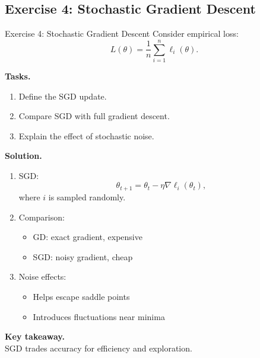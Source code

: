 \documentclass[aspectratio=169,11pt]{beamer}
\begin{document}
\subsection{Exercise 4: Stochastic Gradient Descent}
\begin{frame}[t,allowframebreaks]{Exercise 4: Stochastic Gradient Descent}
\small
Consider empirical loss:
\[
L(\theta) = \frac{1}{n} \sum_{i=1}^n \ell_i(\theta).
\]

\textbf{Tasks.}\\ \begin{enumerate}
    \item Define the SGD update.
    \item Compare SGD with full gradient descent.
    \item Explain the effect of stochastic noise.
\end{enumerate}

\textbf{Solution.}\\ \begin{enumerate}
\item SGD:
\[
\theta_{t+1} = \theta_t - \eta \nabla \ell_i(\theta_t),
\]
where $i$ is sampled randomly.

\item Comparison:
\begin{itemize}
    \item GD: exact gradient, expensive
    \item SGD: noisy gradient, cheap
\end{itemize}

\item Noise effects:
\begin{itemize}
    \item Helps escape saddle points
    \item Introduces fluctuations near minima
\end{itemize}
\end{enumerate}

\textbf{Key takeaway.}\\ SGD trades accuracy for efficiency and exploration.
\end{frame}
\end{document}
